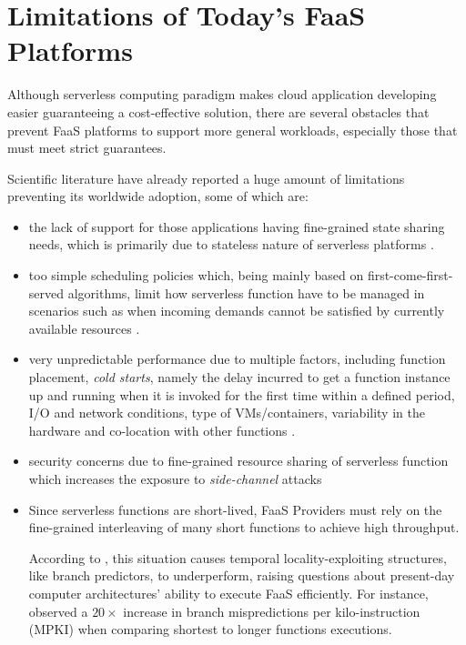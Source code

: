\documentclass[12pt,a4paper]{report}
\begin{document}
\section{Limitations of Today’s FaaS Platforms}

Although serverless computing paradigm makes cloud application developing easier guaranteeing a cost-effective solution, there are several obstacles that prevent FaaS platforms to support more general workloads, especially those that must meet strict guarantees.

Scientific literature have already reported a huge amount of limitations preventing its worldwide adoption, some of which are:

\begin{itemize}
	
	\item the lack of support for those applications having fine-grained state sharing needs, which is primarily due to stateless nature of serverless platforms \cite{BerkeleyView}.
	
	\item too simple scheduling policies which, being mainly based on first-come-first-served algorithms, limit how serverless function have to be managed in scenarios such as when incoming demands cannot be satisfied by currently available resources \cite{Sequoia}.
	
	\item very unpredictable performance due to multiple factors, including function placement, \textit{cold starts}, namely the delay incurred to get a function instance up and running when it is invoked for the first time within a defined period, I/O and network conditions, type of VMs/containers, variability in the hardware and co-location with other functions \cite{COSE}\cite{BerkeleyView}. 
	
	\item security concerns due to fine-grained resource sharing of serverless function which increases the exposure to \textit{side-channel} attacks \cite{NextPhase}
	
	\item Since serverless functions are short-lived, FaaS Providers must rely on the fine-grained interleaving of many short functions to achieve high throughput. 
	
	According to \citet{PredittoriPaperFaaS}, this situation causes temporal locality-exploiting structures, like branch predictors, to underperform, raising questions about present-day computer architectures’ ability to execute FaaS efficiently. For instance, \citet{PredittoriPaperFaaS} observed a $20\times$ increase in branch mispredictions per kilo-instruction (MPKI) when comparing shortest to longer functions executions.
	
\end{itemize}
\end{document}
